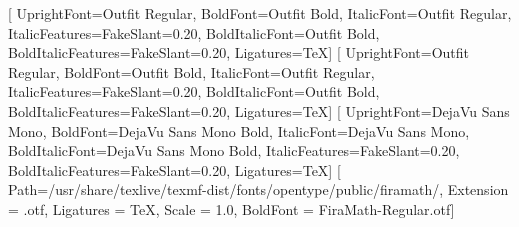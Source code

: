 \usepackage{fontspec}
\usepackage{unicode-math}
\setmainfont{Outfit}[
  UprightFont={Outfit Regular}, BoldFont={Outfit Bold},
  ItalicFont={Outfit Regular}, ItalicFeatures={FakeSlant=0.20},
  BoldItalicFont={Outfit Bold}, BoldItalicFeatures={FakeSlant=0.20},
  Ligatures={TeX}]
\setsansfont{Outfit}[
  UprightFont={Outfit Regular}, BoldFont={Outfit Bold},
  ItalicFont={Outfit Regular}, ItalicFeatures={FakeSlant=0.20},
  BoldItalicFont={Outfit Bold}, BoldItalicFeatures={FakeSlant=0.20},
  Ligatures={TeX}]
\setmonofont{DejaVu Sans Mono}[
  UprightFont={DejaVu Sans Mono}, BoldFont={DejaVu Sans Mono Bold},
  ItalicFont={DejaVu Sans Mono}, BoldItalicFont={DejaVu Sans Mono Bold},
  ItalicFeatures={FakeSlant=0.20}, BoldItalicFeatures={FakeSlant=0.20},
  Ligatures={TeX}]
[
  Path=/usr/share/texlive/texmf-dist/fonts/opentype/public/firamath/,
  Extension = .otf, Ligatures = {TeX}, Scale = 1.0,
  BoldFont = FiraMath-Regular.otf]

